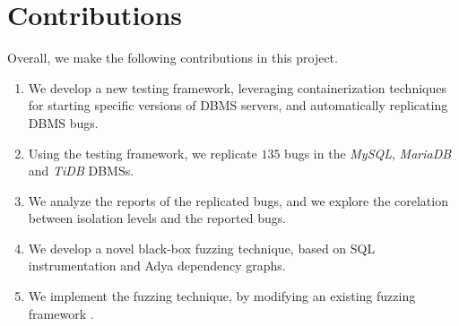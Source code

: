 

\section{Contributions}
Overall, we make the following contributions in this project.

\begin{enumerate}
    \item We develop a new testing framework, leveraging containerization techniques for starting specific versions of DBMS servers, and automatically replicating DBMS bugs.
    \item Using the testing framework, we replicate $135$ bugs in the \textit{MySQL}, \textit{MariaDB} and \textit{TiDB} DBMSs.
    \item We analyze the reports of the replicated bugs, and we explore the corelation between isolation levels and the reported bugs.
    \item We develop a novel black-box fuzzing technique, based on SQL instrumentation and Adya dependency graphs.
    \item We implement the fuzzing technique, by modifying an existing fuzzing framework \cite{jiang2023detecting}. 
\end{enumerate}
